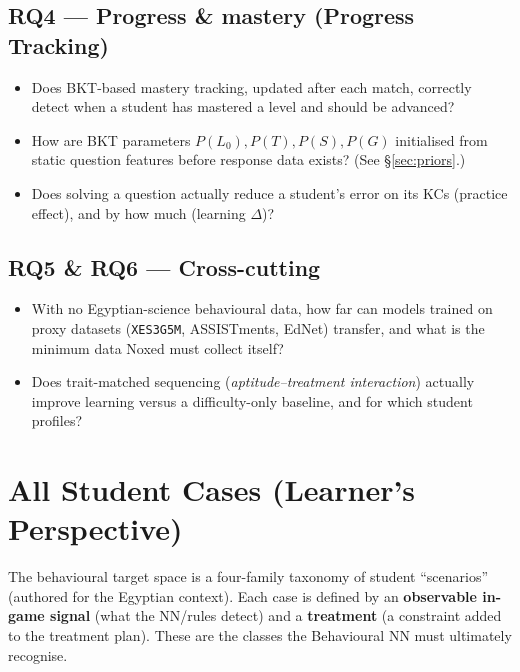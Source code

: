 \documentclass[11pt]{article}
\begin{document}
\subsection{RQ4 --- Progress \& mastery (Progress Tracking)}
\begin{itemize}
\item[\textbf{RQ4}] Does BKT-based mastery tracking, updated after each match, correctly detect when a student has mastered a level and should be advanced?
\item[RQ4.1] How are BKT parameters $P(L_0),P(T),P(S),P(G)$ initialised from static question features before response data exists? (See \S\ref{sec:priors}.)
\item[RQ4.2] Does solving a question actually reduce a student's error on its KCs (practice effect), and by how much (learning $\Delta$)?
\end{itemize}

\subsection{RQ5 \& RQ6 --- Cross-cutting}
\begin{itemize}
\item[\textbf{RQ5 (Cold start / transfer)}] With no Egyptian-science behavioural data, how far can models trained on proxy datasets (\texttt{XES3G5M}, ASSISTments, EdNet) transfer, and what is the minimum data Noxed must collect itself?
\item[\textbf{RQ6 (Efficacy / ATI)}] Does trait-matched sequencing (\emph{aptitude--treatment interaction}) actually improve learning versus a difficulty-only baseline, and for which student profiles?
\end{itemize}

\section{All Student Cases (Learner's Perspective)}\label{sec:cases}
The behavioural target space is a four-family taxonomy of student ``scenarios'' (authored for the Egyptian context). Each case is defined by an \textbf{observable in-game signal} (what the NN/rules detect) and a \textbf{treatment} (a constraint added to the treatment plan). These are the classes the Behavioural NN must ultimately recognise.
\end{document}
